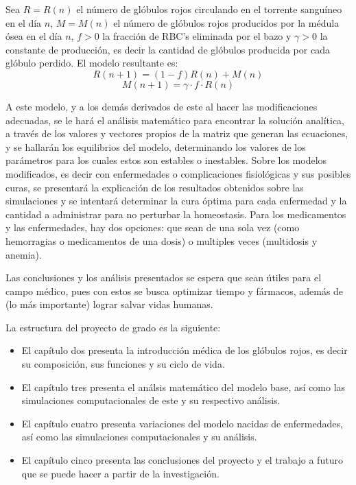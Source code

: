 Sea $R=R(n)$ el número de glóbulos rojos circulando en el torrente sanguíneo en el día $n$, $M=M(n)$ el número de glóbulos rojos producidos por la médula ósea en el día $n$, $f>0$ la fracción de RBC's eliminada por el bazo y $\gamma>0$ la constante de producción, es decir la cantidad de glóbulos producida por cada glóbulo perdido. El modelo resultante es:
$$R(n+1)=(1-f)R(n)+M(n)$$
$$M(n+1)=\gamma \cdot f\cdot R(n)$$

A este modelo, y a los demás derivados de este al hacer las modificaciones adecuadas, se le hará el análisis matemático para encontrar la solución analítica, a través de los valores y vectores propios de la matriz que generan las ecuaciones, y se hallarán los equilibrios del modelo, determinando los valores de los parámetros para los cuales estos son estables o inestables. Sobre los modelos modificados, es decir con enfermedades o complicaciones fisiológicas y sus posibles curas, se presentará la explicación de los resultados obtenidos sobre las simulaciones y se intentará determinar la cura óptima para cada enfermedad y la cantidad a administrar para no perturbar la homeostasis. Para los medicamentos y las enfermedades, hay dos opciones: que sean de una sola vez (como hemorragias o medicamentos de una dosis) o multiples veces (multidosis y anemia).

Las conclusiones y los análisis presentados se espera que sean útiles para el campo médico, pues con estos se busca optimizar tiempo y fármacos, además de (lo más importante) lograr salvar vidas humanas.

La estructura del proyecto de grado es la siguiente:
\begin{itemize}
    \item El capítulo dos presenta la introducción médica de los glóbulos rojos, es decir su composición, sus funciones y su ciclo de vida.
    \item El capítulo tres presenta el análsis matemático del modelo base, así como las simulaciones computacionales de este y su respectivo análisis.
    \item El capítulo cuatro presenta variaciones del modelo nacidas de enfermedades, así como las simulaciones computacionales y su análisis.
    \item El capítulo cinco presenta las conclusiones del proyecto y el trabajo a futuro que se puede hacer a partir de la investigación.
\end{itemize}
